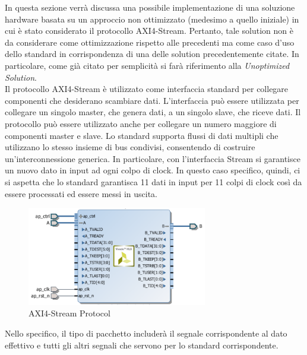 In questa sezione verrà discussa una possibile implementazione di una soluzione hardware basata su un approccio non ottimizzato (medesimo a quello iniziale) in cui è stato considerato il protocollo AXI4-Stream. Pertanto, tale solution non è da considerare come ottimizzazione rispetto alle precedenti ma come caso d'uso dello standard in corrispondenza di una delle solution precedentemente citate. In particolare, come già citato per semplicità si farà riferimento alla \textit{Unoptimized Solution}.
\\
Il protocollo AXI4-Stream è utilizzato come interfaccia standard per collegare componenti che desiderano scambiare dati. L'interfaccia può essere utilizzata per collegare un singolo master, che genera dati, a un singolo slave, che riceve dati. Il protocollo può essere utilizzato anche per collegare un numero maggiore di componenti master e slave. Lo standard supporta flussi di dati multipli che utilizzano lo stesso insieme di bus condivisi, consentendo di costruire un'interconnessione generica. In particolare, con l'interfaccia Stream si garantisce un nuovo dato in input ad ogni colpo di clock. In questo caso specifico, quindi, ci si aspetta che lo standard garantisca 11 dati in input per 11 colpi di clock così da essere processati ed essere messi in uscita.

\begin{figure}[H]
	\centering
	\includegraphics[width=0.7\textwidth]{solutions/axi/axistream.png}
	\caption{AXI4-Stream Protocol}
\end{figure}

Nello specifico, il tipo di pacchetto includerà il segnale corrispondente al dato effettivo e tutti gli altri segnali che servono per lo standard corrispondente.



